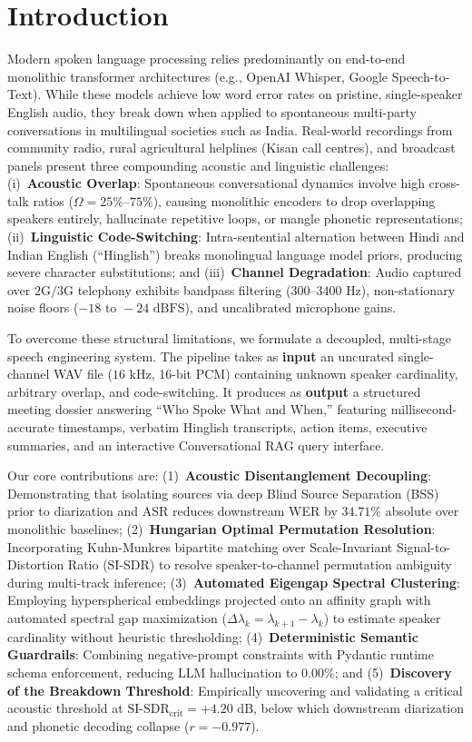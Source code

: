\documentclass[11pt,a4paper,twocolumn]{article}
\begin{document}
\section{Introduction}
Modern spoken language processing relies predominantly on end-to-end monolithic transformer architectures (e.g., OpenAI Whisper, Google Speech-to-Text). While these models achieve low word error rates on pristine, single-speaker English audio, they break down when applied to spontaneous multi-party conversations in multilingual societies such as India. Real-world recordings from community radio, rural agricultural helplines (Kisan call centres), and broadcast panels present three compounding acoustic and linguistic challenges: (i)~\textbf{Acoustic Overlap}: Spontaneous conversational dynamics involve high cross-talk ratios ($\Omega = 25\%\text{--}75\%$), causing monolithic encoders to drop overlapping speakers entirely, hallucinate repetitive loops, or mangle phonetic representations; (ii)~\textbf{Linguistic Code-Switching}: Intra-sentential alternation between Hindi and Indian English (``Hinglish'') breaks monolingual language model priors, producing severe character substitutions; and (iii)~\textbf{Channel Degradation}: Audio captured over $2\text{G}/3\text{G}$ telephony exhibits bandpass filtering ($300\text{--}3400\text{ Hz}$), non-stationary noise floors ($-18\text{ to }-24\text{ dBFS}$), and uncalibrated microphone gains.

To overcome these structural limitations, we formulate a decoupled, multi-stage speech engineering system. The pipeline takes as \textbf{input} an uncurated single-channel WAV file ($16\text{ kHz}$, 16-bit PCM) containing unknown speaker cardinality, arbitrary overlap, and code-switching. It produces as \textbf{output} a structured meeting dossier answering ``Who Spoke What and When,'' featuring millisecond-accurate timestamps, verbatim Hinglish transcripts, action items, executive summaries, and an interactive Conversational RAG query interface.

Our core contributions are: (1)~\textbf{Acoustic Disentanglement Decoupling}: Demonstrating that isolating sources via deep Blind Source Separation (BSS) prior to diarization and ASR reduces downstream WER by $34.71\%$ absolute over monolithic baselines; (2)~\textbf{Hungarian Optimal Permutation Resolution}: Incorporating Kuhn-Munkres bipartite matching over Scale-Invariant Signal-to-Distortion Ratio (SI-SDR) to resolve speaker-to-channel permutation ambiguity during multi-track inference; (3)~\textbf{Automated Eigengap Spectral Clustering}: Employing hyperspherical embeddings projected onto an affinity graph with automated spectral gap maximization ($\Delta \lambda_k = \lambda_{k+1} - \lambda_k$) to estimate speaker cardinality without heuristic thresholding; (4)~\textbf{Deterministic Semantic Guardrails}: Combining negative-prompt constraints with Pydantic runtime schema enforcement, reducing LLM hallucination to $0.00\%$; and (5)~\textbf{Discovery of the Breakdown Threshold}: Empirically uncovering and validating a critical acoustic threshold at $\text{SI-SDR}_{\text{crit}} = +4.20\text{ dB}$, below which downstream diarization and phonetic decoding collapse ($r = -0.977$).
\end{document}
